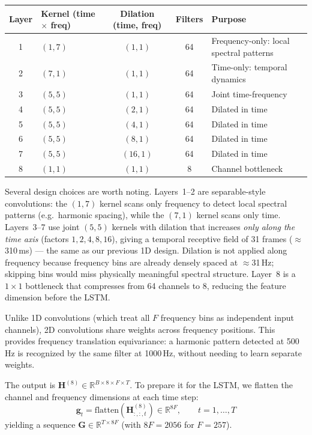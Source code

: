 \documentclass{article}
\begin{document}
\begin{table}[H]
\centering
\small
\begin{tabular}{@{}clccl@{}}
\toprule
\textbf{Layer} & \textbf{Kernel} (time $\times$ freq) & \textbf{Dilation} (time, freq) & \textbf{Filters} & \textbf{Purpose} \\
\midrule
1 & $(1, 7)$ & $(1, 1)$ & 64 & Frequency-only: local spectral patterns \\
2 & $(7, 1)$ & $(1, 1)$ & 64 & Time-only: temporal dynamics \\
3 & $(5, 5)$ & $(1, 1)$ & 64 & Joint time-frequency \\
4 & $(5, 5)$ & $(2, 1)$ & 64 & Dilated in time \\
5 & $(5, 5)$ & $(4, 1)$ & 64 & Dilated in time \\
6 & $(5, 5)$ & $(8, 1)$ & 64 & Dilated in time \\
7 & $(5, 5)$ & $(16, 1)$ & 64 & Dilated in time \\
8 & $(1, 1)$ & $(1, 1)$ & 8  & Channel bottleneck \\
\bottomrule
\end{tabular}
\end{table}

Several design choices are worth noting. Layers~1--2 are separable-style convolutions: the $(1, 7)$ kernel scans only frequency to detect local spectral patterns (e.g.\ harmonic spacing), while the $(7, 1)$ kernel scans only time. Layers~3--7 use joint $(5, 5)$ kernels with dilation that increases \emph{only along the time axis} (factors $1, 2, 4, 8, 16$), giving a temporal receptive field of 31 frames ($\approx$310\,ms) --- the same as our previous 1D design. Dilation is not applied along frequency because frequency bins are already densely spaced at $\approx$31\,Hz; skipping bins would miss physically meaningful spectral structure. Layer~8 is a $1 \times 1$ bottleneck that compresses from 64 channels to 8, reducing the feature dimension before the LSTM.

Unlike 1D convolutions (which treat all $F$ frequency bins as independent input channels), 2D convolutions share weights across frequency positions. This provides frequency translation equivariance: a harmonic pattern detected at 500\,Hz is recognized by the same filter at 1000\,Hz, without needing to learn separate weights.

The output is $\mathbf{H}^{(8)} \in \mathbb{R}^{B \times 8 \times F \times T}$. To prepare it for the LSTM, we flatten the channel and frequency dimensions at each time step:
\[
    \mathbf{g}_t = \text{flatten}(\mathbf{H}^{(8)}_{:,:,t}) \in \mathbb{R}^{8F}, \qquad t = 1, \dots, T
\]
yielding a sequence $\mathbf{G} \in \mathbb{R}^{T \times 8F}$ (with $8F = 2056$ for $F = 257$).
\end{document}
